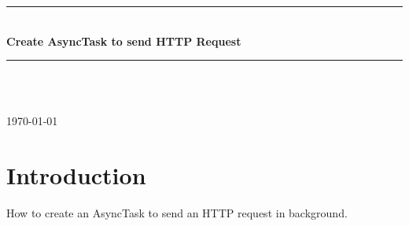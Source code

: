 \documentclass[12pt]{article} %
\begin{document}

\begin{titlepage}

\newcommand{\HRule}{\rule{\linewidth}{0.5mm}} %

\center %

\HRule \\[0.4cm]
{ \huge \bfseries Create AsyncTask to send HTTP Request}\\[0.4cm] %
\HRule \\[1.5cm]

\begin{minipage}{0.4\textwidth}
\end{minipage}\\[4cm]

{\large \today}\\[3cm] %


\vfill %

\end{titlepage}


\tableofcontents %

\newpage %


\section{Introduction} %

How to create an AsyncTask to send an HTTP request in background.
\end{document}
